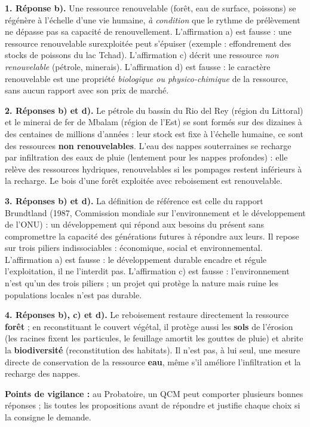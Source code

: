 \documentclass[11pt]{article}
\newcommand{\cle}[1]{{\popxbold\color{popdark}#1}}
\begin{document}
\begin{corrige}
\textbf{1. Réponse b).} Une ressource renouvelable (forêt, eau de surface, poissons) se régénère à l'échelle d'une vie humaine, \emph{à condition} que le rythme de prélèvement ne dépasse pas sa capacité de renouvellement. L'affirmation a) est fausse : une ressource renouvelable surexploitée peut s'épuiser (exemple : effondrement des stocks de poissons du lac Tchad). L'affirmation c) décrit une ressource \emph{non renouvelable} (pétrole, minerais). L'affirmation d) est fausse : le caractère renouvelable est une propriété \emph{biologique ou physico-chimique} de la ressource, sans aucun rapport avec son prix de marché.

\textbf{2. Réponses b) et d).} Le pétrole du bassin du Rio del Rey (région du Littoral) et le minerai de fer de Mbalam (région de l'Est) se sont formés sur des dizaines à des centaines de millions d'années : leur stock est fixe à l'échelle humaine, ce sont des ressources \textbf{non renouvelables}. L'eau des nappes souterraines se recharge par infiltration des eaux de pluie (lentement pour les nappes profondes) : elle relève des ressources hydriques, renouvelables si les pompages restent inférieurs à la recharge. Le bois d'une forêt exploitée avec reboisement est renouvelable.

\textbf{3. Réponses b) et d).} La définition de référence est celle du rapport Brundtland (1987, Commission mondiale sur l'environnement et le développement de l'ONU) : un développement qui répond aux besoins du présent sans compromettre la capacité des générations futures à répondre aux leurs. Il repose sur trois piliers indissociables : \cle{économique}, \cle{social} et \cle{environnemental}. L'affirmation a) est fausse : le développement durable encadre et régule l'exploitation, il ne l'interdit pas. L'affirmation c) est fausse : l'environnement n'est qu'un des trois piliers ; un projet qui protège la nature mais ruine les populations locales n'est pas durable.

\textbf{4. Réponses b), c) et d).} Le reboisement restaure directement la ressource \textbf{forêt} ; en reconstituant le couvert végétal, il protège aussi les \textbf{sols} de l'érosion (les racines fixent les particules, le feuillage amortit les gouttes de pluie) et abrite la \textbf{biodiversité} (reconstitution des habitats). Il n'est pas, à lui seul, une mesure directe de conservation de la ressource \textbf{eau}, même s'il améliore l'infiltration et la recharge des nappes.

\textbf{Points de vigilance :} au Probatoire, un QCM peut comporter plusieurs bonnes réponses ; lis toutes les propositions avant de répondre et justifie chaque choix si la consigne le demande.
\end{corrige}
\end{document}
